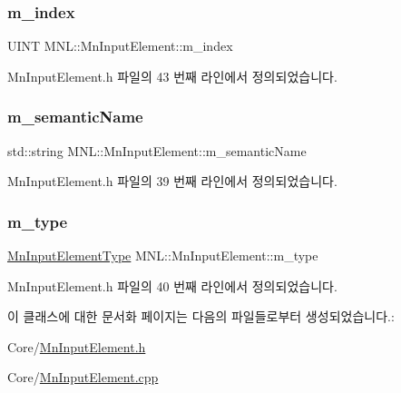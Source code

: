 \subsubsection{\texorpdfstring{m\+\_\+index}{m\_index}}
{\footnotesize\ttfamily U\+I\+NT M\+N\+L\+::\+Mn\+Input\+Element\+::m\+\_\+index\hspace{0.3cm}{\ttfamily [private]}}



Mn\+Input\+Element.\+h 파일의 43 번째 라인에서 정의되었습니다.

\mbox{\label{class_m_n_l_1_1_mn_input_element_add6831c8eac59037aea8ab7f0ad590ca}} 
\subsubsection{\texorpdfstring{m\+\_\+semantic\+Name}{m\_semanticName}}
{\footnotesize\ttfamily std\+::string M\+N\+L\+::\+Mn\+Input\+Element\+::m\+\_\+semantic\+Name\hspace{0.3cm}{\ttfamily [private]}}



Mn\+Input\+Element.\+h 파일의 39 번째 라인에서 정의되었습니다.

\mbox{\label{class_m_n_l_1_1_mn_input_element_a8c81b40be5e4108e7473b0589e0da8f5}} 
\subsubsection{\texorpdfstring{m\+\_\+type}{m\_type}}
{\footnotesize\ttfamily \hyperlink{namespace_m_n_l_a8605571a36b2bb477280767d71fe6f9e}{Mn\+Input\+Element\+Type} M\+N\+L\+::\+Mn\+Input\+Element\+::m\+\_\+type\hspace{0.3cm}{\ttfamily [private]}}



Mn\+Input\+Element.\+h 파일의 40 번째 라인에서 정의되었습니다.



이 클래스에 대한 문서화 페이지는 다음의 파일들로부터 생성되었습니다.\+:\begin{DoxyCompactItemize}
\item 
Core/\hyperlink{_mn_input_element_8h}{Mn\+Input\+Element.\+h}\item 
Core/\hyperlink{_mn_input_element_8cpp}{Mn\+Input\+Element.\+cpp}\end{DoxyCompactItemize}
